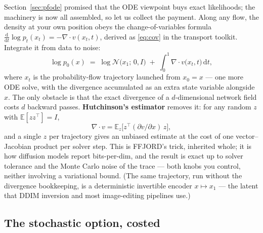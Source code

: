 \documentclass[10pt,a4paper]{article}
\newcommand{\E}{\mathbb{E}}
\newcommand{\dd}{\mathrm{d}}
\begin{document}
Section~\ref{sec:pfode} promised that the ODE viewpoint buys exact
likelihoods; the machinery is now all assembled, so let us collect the
payment. Along any flow, the density at your own position obeys the
change-of-variables formula
$\tfrac{\dd}{\dd t} \log p_t(x_t) = -\nabla\!\cdot\!v(x_t, t)$, derived
as \eqref{eq:cov} in the transport toolkit. Integrate it
from data to noise:
\begin{equation}
\log p_0(x) \;=\; \log \mathcal{N}\big(x_1;\, 0, I\big)
\;+\; \int_0^1 \nabla\!\cdot\!v\big(x_t, t\big)\, \dd t ,
\label{eq:likelihood}
\end{equation}
where $x_t$ is the probability-flow trajectory launched from $x_0 = x$
--- one more ODE solve, with the divergence accumulated as an extra
state variable alongside $x$. The only obstacle is that the exact
divergence of a $d$-dimensional network field costs $d$ backward passes.
\textbf{Hutchinson's estimator} removes it: for any random $z$ with
$\E[z z^\top] = I$,
\begin{equation}
\nabla\!\cdot\!v = \E_z\big[ z^\top (\partial v / \partial x)\, z \big],
\end{equation}
and a single $z$ per trajectory gives an unbiased estimate at the cost
of one vector--Jacobian product per solver step. This is FFJORD's trick,
inherited whole; it is how diffusion models report bits-per-dim, and the
result is exact up to solver tolerance and the Monte Carlo noise of the
trace --- both knobs you control, neither involving a variational bound.
(The same trajectory, run without the divergence bookkeeping, is a
deterministic invertible encoder $x \mapsto x_1$ --- the latent that
DDIM inversion and most image-editing pipelines use.)

\subsection{The stochastic option, costed}
\label{sec:sde-solvers}
\end{document}

